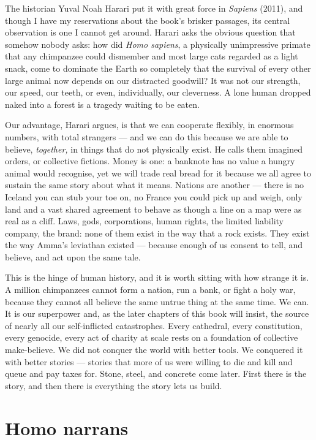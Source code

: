 The historian Yuval Noah Harari put it with great force in \emph{Sapiens} (2011), and though I have my reservations about the book's brisker passages, its central observation is one I cannot get around. Harari asks the obvious question that somehow nobody asks: how did \emph{Homo sapiens}, a physically unimpressive primate that any chimpanzee could dismember and most large cats regarded as a light snack, come to dominate the Earth so completely that the survival of every other large animal now depends on our distracted goodwill? It was not our strength, our speed, our teeth, or even, individually, our cleverness. A lone human dropped naked into a forest is a tragedy waiting to be eaten.

Our advantage, Harari argues, is that we can cooperate flexibly, in enormous numbers, with total strangers — and we can do this because we are able to believe, \emph{together,} in things that do not physically exist. He calls them imagined orders, or collective fictions. Money is one: a banknote has no value a hungry animal would recognise, yet we will trade real bread for it because we all agree to sustain the same story about what it means. Nations are another — there is no Iceland you can stub your toe on, no France you could pick up and weigh, only land and a vast shared agreement to behave as though a line on a map were as real as a cliff. Laws, gods, corporations, human rights, the limited liability company, the brand: none of them exist in the way that a rock exists. They exist the way Amma's leviathan existed — because enough of us consent to tell, and believe, and act upon the same tale.

This is the hinge of human history, and it is worth sitting with how strange it is. A million chimpanzees cannot form a nation, run a bank, or fight a holy war, because they cannot all believe the same untrue thing at the same time. We can. It is our superpower and, as the later chapters of this book will insist, the source of nearly all our self-inflicted catastrophes. Every cathedral, every constitution, every genocide, every act of charity at scale rests on a foundation of collective make-believe. We did not conquer the world with better tools. We conquered it with better stories — stories that more of us were willing to die and kill and queue and pay taxes for. Stone, steel, and concrete come later. First there is the story, and then there is everything the story lets us build.

\section*{Homo narrans}

